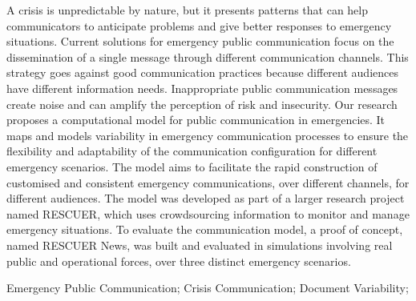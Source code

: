 A crisis is unpredictable by nature, but it presents patterns that can help communicators to anticipate problems and give better responses to emergency situations. Current solutions for emergency public communication focus on the dissemination of a single message through different communication channels. This strategy goes against good communication practices because different audiences have different information needs. Inappropriate public communication messages create noise and can amplify the perception of risk and insecurity.  Our research proposes a computational model for public communication in emergencies. It maps and models variability in emergency communication processes to ensure the flexibility and adaptability of the communication configuration for different emergency scenarios. The model aims to facilitate the rapid construction of customised and consistent emergency communications, over different channels, for different audiences. The model was developed as part of a larger research project named RESCUER, which uses crowdsourcing information to monitor and manage emergency situations. To evaluate the communication model, a proof of concept, named RESCUER News, was built and evaluated in simulations involving real public and operational forces, over three distinct emergency scenarios. 




\begin{keywords}
Emergency Public Communication; Crisis Communication; Document Variability; 
\end{keywords}

